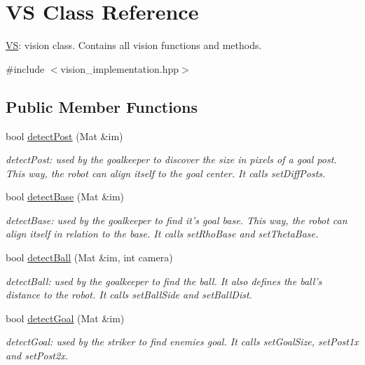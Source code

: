 \hypertarget{classVS}{\section{V\-S Class Reference}
\label{classVS}
}


\hyperlink{classVS}{V\-S}\-: vision class. Contains all vision functions and methods.  




{\ttfamily \#include $<$vision\-\_\-implementation.\-hpp$>$}

\subsection*{Public Member Functions}
\begin{DoxyCompactItemize}
\item 
bool \hyperlink{classVS_a84ea859f338a2da5a1392cf7fd8b7128}{detect\-Post} (Mat \&im)
\begin{DoxyCompactList}\small\item\em detect\-Post\-: used by the goalkeeper to discover the size in pixels of a goal post. This way, the robot can align itself to the goal center. It calls set\-Diff\-Posts. \end{DoxyCompactList}\item 
bool \hyperlink{classVS_a7bbb156618172c39ec330e7747f7d4fa}{detect\-Base} (Mat \&im)
\begin{DoxyCompactList}\small\item\em detect\-Base\-: used by the goalkeeper to find it's goal base. This way, the robot can align itself in relation to the base. It calls set\-Rho\-Base and set\-Theta\-Base. \end{DoxyCompactList}\item 
bool \hyperlink{classVS_a2f232abc906e9b112d24d6240e029f78}{detect\-Ball} (Mat \&im, int camera)
\begin{DoxyCompactList}\small\item\em detect\-Ball\-: used by the goalkeeper to find the ball. It also defines the ball's distance to the robot. It calls set\-Ball\-Side and set\-Ball\-Dist. \end{DoxyCompactList}\item 
bool \hyperlink{classVS_aee9246a9272045f73a40536e3aace627}{detect\-Goal} (Mat \&im)
\begin{DoxyCompactList}\small\item\em detect\-Goal\-: used by the striker to find enemies goal. It calls set\-Goal\-Size, set\-Post1x and set\-Post2x. \end{DoxyCompactList}\item 

\end{DoxyCompactItemize}
